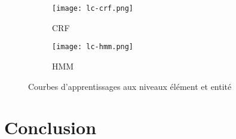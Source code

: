 \begin{figure}[!htb]
\centering
\begin{subfigure}[t]{0.95\textwidth}
\centering
\texttt{[image: lc-crf.png]}
\caption{CRF} \label{fig:structuration:learning-curves-crf}
\end{subfigure} 

\begin{subfigure}[t]{0.95\textwidth}
\centering
\texttt{[image: lc-hmm.png]}
\caption{HMM} \label{fig:structuration:learning-curves-hmm}
\end{subfigure}
\caption{Courbes d'apprentissages aux niveaux élément et entité} \label{fig:structuration:learning-curves}
\end{figure}

\section{Conclusion}
\label{sec:structuration:conclusion}
